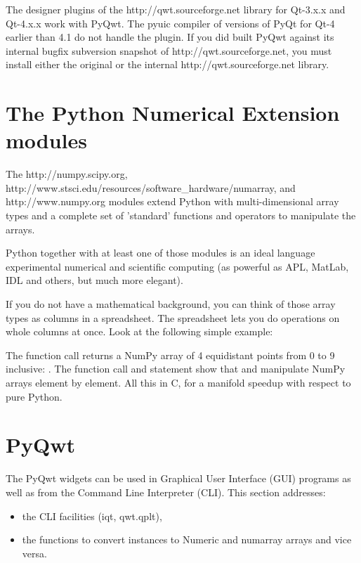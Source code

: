 \documentclass{manual}
\newcommand{\Qwt}{\ulink{Qwt}
  {http://qwt.sourceforge.net}}
\newcommand{\NumPy}{\ulink{NumPy}
  {http://numpy.scipy.org}}
\newcommand{\numarray}{\ulink{numarray}
  {http://www.stsci.edu/resources/software_hardware/numarray}}
\newcommand{\Numeric}{\ulink{Numeric}
  {http://www.numpy.org}}
\newcommand{\PyQwtLatestTarGz}{\ulink{PyQwt-5.0.1.tar.gz}
  {http://prdownloads.sourceforge.net/pyqwt/PyQwt-5.0.1.tar.gz?download}}
\newcommand{\Future}{
  \begin{notice}[warning]
    The documentation is for PyQwt-5.0.1 which has not yet been released. The
    latest release is \PyQwtLatestTarGz{} and refer to the documentation
    included in the latest release when using it.
  \end{notice}
}
\renewcommand{\Future}{}
\begin{document}
\begin{notice}[note]
  The designer plugins of the \Qwt{} library for Qt-3.x.x and Qt-4.x.x work
  with PyQwt. The pyuic compiler of versions of PyQt for Qt-4 earlier than
  4.1 do not handle the plugin.
  If you did built PyQwt against its internal bugfix subversion snapshot of
  \Qwt{}, you must install either the original or the internal \Qwt{} library.
\end{notice}


\section{The Python Numerical Extension modules \label{numeric-intro}}

\Future{}

The \NumPy{}, \numarray{}, and \Numeric{} modules extend Python with
multi-dimensional array types and a complete set of 'standard' functions
and operators to manipulate the arrays.

Python together with at least one of those modules is an ideal language
experimental numerical and scientific computing (as powerful as APL, MatLab,
IDL and others, but much more elegant).

If you do not have a mathematical background, you can think of those array
types as columns in a spreadsheet.  The spreadsheet lets you do operations
on whole columns at once.  Look at the following simple example:



The function call  returns a NumPy array of 4
equidistant points from 0 to 9 inclusive: .
The function call  and statement  show that
 and \samp{*} manipulate NumPy arrays element by element.
All this in C, for a manifold speedup with respect to pure Python.


\section{PyQwt
  \label{pyqwt-intro}}

\Future{}

The PyQwt widgets can be used in Graphical User Interface (GUI)
programs as well as from the Command Line Interpreter (CLI).
This section addresses:
\begin{itemize}
\item
  the CLI facilities (iqt, qwt.qplt),
\item
  the functions to convert  instances to Numeric and numarray
  arrays and vice versa.
\end{itemize}
\end{document}
